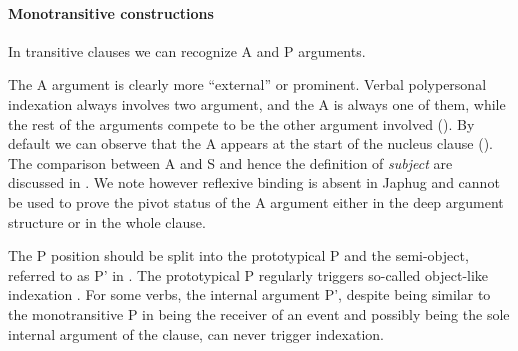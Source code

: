 \documentclass[a4paper, oneside, 12pt]{report}
\newcommand*{\citesec}[1]{\S~{#1}}
\newcommand*{\citepage}[1]{p.~{#1}}
\newcommand*{\term}[1]{\emph{#1}}
\begin{document}
\paragraph*{Monotransitive constructions}
\label{sec:grammatical.clause.internal.monotransitive}
In transitive clauses we can recognize A and P arguments.

The A argument is clearly more ``external'' or prominent.
Verbal polypersonal indexation always involves two argument,
and the A is always one of them, 
while the rest of the arguments compete to be the other argument involved 
().
By default we can observe that the A 
appears at the start of the nucleus clause 
().
The comparison between A and S and hence the definition of \term{subject}
are discussed in .
We note however reflexive binding is absent in Japhug
\citep[\citepage{543}]{jacques2021grammar}
and cannot be used to prove the pivot status of the A argument
either in the deep argument structure or in the whole clause.

The P position should be split into the prototypical P
and the semi-object, referred to as P' in \citet{jacques2016subjects}.
The prototypical P regularly triggers so-called object-like indexation
\citep[\citesec{8.1.3}, \citepage{543}]{jacques2021grammar}.
For some verbs, the internal argument P',
despite being similar to the monotransitive P in being the receiver of an event 
and possibly being the sole internal argument of the clause,
can never trigger indexation.
\end{document}
